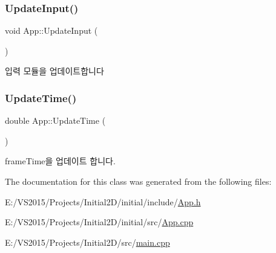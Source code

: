 \subsubsection{\texorpdfstring{UpdateInput()}{UpdateInput()}}
{\footnotesize\ttfamily void App\+::\+Update\+Input (\begin{DoxyParamCaption}{ }\end{DoxyParamCaption})}

입력 모듈을 업데이트합니다 \mbox{\label{class_app_af9d5285ac1a905e871d1c0b7a4c14c2c}} 
\subsubsection{\texorpdfstring{UpdateTime()}{UpdateTime()}}
{\footnotesize\ttfamily double App\+::\+Update\+Time (\begin{DoxyParamCaption}{ }\end{DoxyParamCaption})}

frame\+Time을 업데이트 합니다. 

The documentation for this class was generated from the following files\+:\begin{DoxyCompactItemize}
\item 
E\+:/\+V\+S2015/\+Projects/\+Initial2\+D/initial/include/\mbox{\hyperlink{_app_8h}{App.\+h}}\item 
E\+:/\+V\+S2015/\+Projects/\+Initial2\+D/initial/src/\mbox{\hyperlink{_app_8cpp}{App.\+cpp}}\item 
E\+:/\+V\+S2015/\+Projects/\+Initial2\+D/src/\mbox{\hyperlink{main_8cpp}{main.\+cpp}}\end{DoxyCompactItemize}
